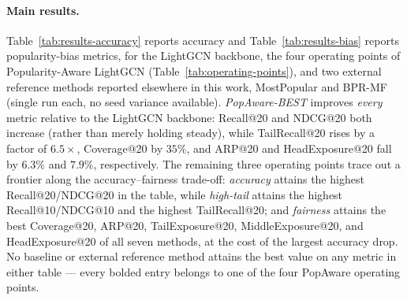 \paragraph{Main results.}
Table~\ref{tab:results-accuracy} reports accuracy and Table~\ref{tab:results-bias} reports
popularity-bias metrics, for the LightGCN backbone, the four operating points of
Popularity-Aware LightGCN (Table~\ref{tab:operating-points}), and two external reference
methods reported elsewhere in this work, MostPopular and BPR-MF (single run each, no seed
variance available). \emph{PopAware-BEST} improves \emph{every} metric relative to the
LightGCN backbone: Recall@20 and NDCG@20 both increase (rather than merely holding steady),
while TailRecall@20 rises by a factor of $6.5\times$, Coverage@20 by $35\%$, and ARP@20 and
HeadExposure@20 fall by $6.3\%$ and $7.9\%$, respectively. The remaining three operating
points trace out a frontier along the accuracy--fairness trade-off: \emph{accuracy} attains
the highest Recall@20/NDCG@20 in the table, while \emph{high-tail} attains the highest
Recall@10/NDCG@10 and the highest TailRecall@20; and \emph{fairness} attains the best
Coverage@20, ARP@20, TailExposure@20, MiddleExposure@20, and HeadExposure@20 of all seven
methods, at the cost of the largest accuracy drop. No baseline or external reference method
attains the best value on any metric in either table --- every bolded entry belongs to one of
the four PopAware operating points.

\begin{table}[t]
\centering
\footnotesize
\caption{Accuracy metrics on the MovieLens-1M test set. PopAware rows report mean $\pm$
std over 3 seeds; MostPopular and BPR-MF are single-run external references.}
\label{tab:results-accuracy}
\end{table}

